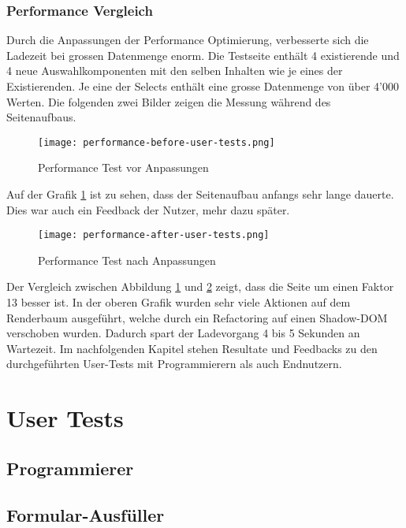 \subsubsection{\color{dgray} Performance Vergleich}

Durch die Anpassungen der Performance Optimierung, verbesserte sich die Ladezeit bei grossen Datenmenge enorm.
Die Testseite enthält 4 existierende und 4 neue Auswahlkomponenten mit den selben Inhalten wie je eines der Existierenden.
Je eine der Selects enthält eine grosse Datenmenge von über 4'000 Werten.
Die folgenden zwei Bilder zeigen die Messung während des Seitenaufbaus.

\begin{figure}[!htb]
    \centering
    \texttt{[image: performance-before-user-tests.png]}
    \caption{Performance Test vor Anpassungen}
    \label{img:PerformanceTestBefore}
\end{figure}

Auf der Grafik \ref{img:PerformanceTestBefore} ist zu sehen, dass der Seitenaufbau anfangs sehr lange dauerte.
Dies war auch ein Feedback der Nutzer, mehr dazu später.

\begin{figure}[!htb]
    \centering
    \texttt{[image: performance-after-user-tests.png]}
    \caption{Performance Test nach Anpassungen}
    \label{img:PerformanceTestAfter}
\end{figure}

Der Vergleich zwischen Abbildung \ref{img:PerformanceTestBefore} und \ref{img:PerformanceTestAfter} zeigt, dass die Seite um einen Faktor 13 besser ist.
In der oberen Grafik wurden sehr viele Aktionen auf dem Renderbaum ausgeführt, welche durch ein Refactoring auf einen Shadow-DOM verschoben wurden.
Dadurch spart der Ladevorgang 4 bis 5 Sekunden an Wartezeit.
Im nachfolgenden Kapitel stehen Resultate und Feedbacks zu den durchgeführten User-Tests mit Programmierern als auch Endnutzern.


\section{User Tests}


\subsection{Programmierer}



\subsection{Formular-Ausfüller}



